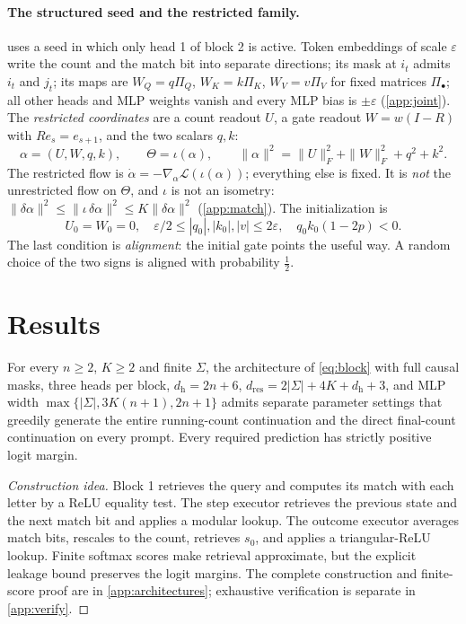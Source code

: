 \paragraph{The structured seed and the restricted family.}\label{sec:seed}
 uses a seed in which only head 1 of block 2 is active. Token embeddings of scale $\varepsilon$ write the count and the match bit into separate directions; its mask at $i_t$ admits $i_t$ and $j_t$; its maps are $W_Q=q\Pi_Q$, $W_K=k\Pi_K$, $W_V=v\Pi_V$ for fixed matrices $\Pi_\bullet$; all other heads and MLP weights vanish and every MLP bias is $\pm\varepsilon$ (\cref{app:joint}). The \emph{restricted coordinates} are a count readout $U$, a gate readout $W=w(I-R)$ with $Re_s=e_{s+1}$, and the two scalars $q,k$:
\begin{equation}\label{eq:metric}
\alpha=(U,W,q,k),\qquad \Theta=\iota(\alpha),\qquad \|\alpha\|^2=\|U\|_F^2+\|W\|_F^2+q^2+k^2.
\end{equation}
The restricted flow is $\dot\alpha=-\nabla_\alpha\mathcal L(\iota(\alpha))$; everything else is fixed. It is \emph{not} the unrestricted flow on $\Theta$, and $\iota$ is not an isometry: $\|\delta\alpha\|^2\le\|\iota\,\delta\alpha\|^2\le K\|\delta\alpha\|^2$ (\cref{app:match}). The initialization is
\begin{equation}\label{eq:init}
U_0=W_0=0,\quad \varepsilon/2\le|q_0|,|k_0|,|v|\le2\varepsilon,
\quad q_0k_0(1-2p)<0.
\end{equation}
The last condition is \emph{alignment}: the initial gate points the useful way. A random choice of the two signs is aligned with probability $\frac12$.

\section{Results}\label{sec:results}
\begin{proposition}\label{prop:represent}
For every $n\ge2$, $K\ge2$ and finite $\Sigma$, the architecture of \cref{eq:block} with full causal masks, three heads per block, $d_{\mathrm h}=2n+6$, $d_{\mathrm{res}}=2|\Sigma|+4K+d_{\mathrm h}+3$, and MLP width $\max\{|\Sigma|,3K(n+1),2n+1\}$ admits separate parameter settings that greedily generate the entire running-count continuation and the direct final-count continuation on every prompt. Every required prediction has strictly positive logit margin.
\end{proposition}
\begin{proof}[Construction idea]
Block 1 retrieves the query and computes its match with each letter by a ReLU equality test. The step executor retrieves the previous state and the next match bit and applies a modular lookup. The outcome executor averages match bits, rescales to the count, retrieves $s_0$, and applies a triangular-ReLU lookup. Finite softmax scores make retrieval approximate, but the explicit leakage bound preserves the logit margins. The complete construction and finite-score proof are in \cref{app:architectures}; exhaustive verification is separate in \cref{app:verify}.
\end{proof}

